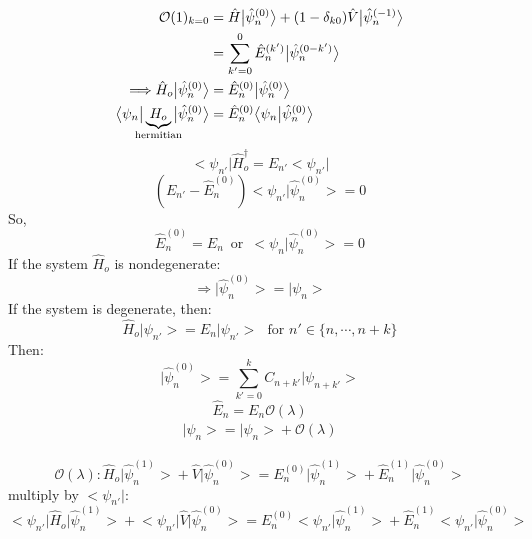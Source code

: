\documentclass[12pt,fancychapters]{report}
\numberwithin{equation}{section}
\begin{document}
\begin{align*}
	\mathcal{O}(1)_{k=0} & = \hat{H} \big | \hat{\psi}^{(0)}_n \big > + (1 - \delta_{k0}) \hat{V}
	\big | \hat{\psi}^{(-1)}_n \big >\\
	& = \sum_{k' = 0}^{0} \hat{E}^{(k')}_n \big| \hat{\psi}^{(0-k')}_n \big>\\
	\Longrightarrow \hat{H}_o \big| \hat{\psi}^{(0)}_n \big > & = \hat{E}^{(0)}_n \big| \hat{\psi}^{(0)}_n \big>\\
  \big < \psi_n \big | \underbrace{H_o}_{\mathclap{\text{hermitian}}} \big| \hat{\psi}^{(0)}_n \big > & = \hat{E}^{(0)}_n \big < \psi_n   \big |
	\hat{\psi}^{(0)}_n\big>
\end{align*}
\begin{equation*}
	\big < \psi_{n'} \big|\hat{H}_o ^\dag = E_{n'} \big < \psi_{n'} \big |
\end{equation*}
\begin{equation*}
	(E_{n'} - \hat{E}^{(0)}_n)\big < \psi_{n'} \big|\hat{\psi}^{(0)}_n \big > = 0
\end{equation*}
\noindent
So,
\[ \hat{E}^{(0)}_n = E_n\,\,\,\text{or}\,\,\,\big < \psi_n \big| \hat{\psi}^{(0)}_n \big > = 0 \]
\noindent
If the system $\hat{H}_o$ is nondegenerate: 
\[ \Longrightarrow \big|\hat{\psi}^{(0)}_n\big> = \big| \psi_n \big >\]
If the system is degenerate, then:
\begin{equation*}
	\hat{H}_o \big|\psi_{n'} \big > = E_n \big| \psi_{n'} \big >\,\,\,\,\text{for } n' \in \{n, \cdots, n+k\}
\end{equation*}
Then:
\begin{equation*}
	\big | \hat{\psi}^{(0)}_n \big > = \sum_{k'=0}^{k} C_{n+k'} \big|\psi_{n+k'} \big >
\end{equation*}
\begin{equation*}
	\hat{E}_n = E_n \mathcal{O}(\lambda)
\end{equation*}
\begin{equation*}
	\big | \hat{\psi}_n \big > = | \psi_n\big > + \mathcal{O}(\lambda)
\end{equation*}
\\
\begin{equation*}
\mathcal{O}(\lambda): \hat{H}_o \big|\hat{\psi}^{(1)}_n \big> + \hat{V} \big|\hat{\psi}^{(0)}_n \big>
= E_n^{(0)} \big|\hat{\psi}^{(1)}_n \big> + \hat{E}^{(1)}_n  \big|\hat{\psi}^{(0)}_n \big> 
\end{equation*}
multiply by $\big<\psi_{n'} \big|$:
\begin{equation*}
\big<\psi_{n'} \big|\hat{H}_o \big|\hat{\psi}^{(1)}_n \big> + \big<\psi_{n'} \big|\hat{V} \big|\hat{\psi}^{(0)}_n \big>
= E_n^{(0)}\big<\psi_{n'}\big|\hat{\psi}^{(1)}_n \big> + \hat{E}^{(1)}_n \big<\psi_{n'} \big|\hat{\psi}^{(0)}_n \big> 
\end{equation*}
\end{document}
